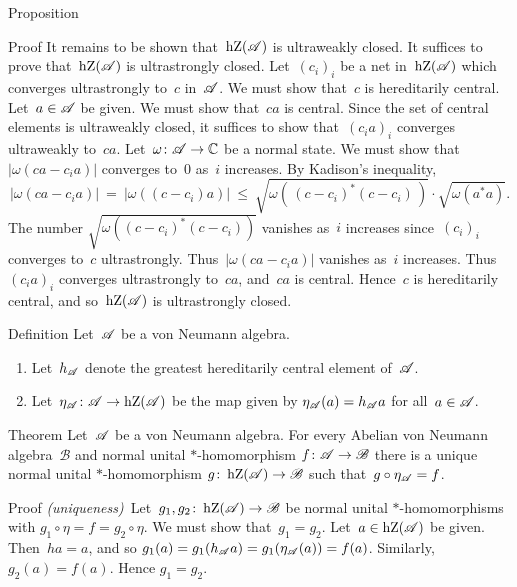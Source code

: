 \documentclass[main]{subfiles}
\begin{document}
\begin{parsec}
\begin{point}{Proposition}
\begin{point}{Proof}
It remains to be shown that~$\operatorname{hZ}(\mathscr{A})$ is ultraweakly closed.
It suffices to prove that~$\operatorname{hZ}(\mathscr{A})$
is ultrastrongly closed.
Let~$(c_i)_i$ be a net in~$\operatorname{hZ}(\mathscr{A})$
which converges ultrastrongly to~$c$ in~$\mathscr{A}$.
We must show that~$c$ is hereditarily central.
Let~$a\in \mathscr{A}$ be given.
We must show that~$ca$ is central.
Since the set of central elements is ultraweakly closed,
it suffices to show that~$(c_ia)_i$ converges ultraweakly to~$ca$.
Let~$\omega\colon\mathscr{A}\to\mathbb{C}$
be a normal state.
We must show that $|\omega(ca-c_ia)|$
converges to~$0$ as~$i$ increases.
By Kadison's inequality,
\begin{equation*}
|\omega(ca -c_ia)| \ =\  |\omega((c-c_i)a)|
\ \leq\  \sqrt{\omega(\,(c-c_i)^*(c-c_i)\,)}\cdot\sqrt{\omega(a^*a)}.
\end{equation*}
The number $\sqrt{\omega((c-c_i)^*(c-c_i))}$ 
vanishes as~$i$ increases
since~$(c_i)_i$ converges to~$c$ ultrastrongly.
Thus~$|\omega(ca-c_ia)|$ vanishes as~$i$ increases.
Thus~$(c_ia)_i$ converges ultrastrongly to~$ca$,
and~$ca$ is central.
Hence~$c$ is hereditarily central,
and so~$\operatorname{hZ}(\mathscr{A})$
is ultrastrongly closed.
\end{point}
\end{point}
\begin{point}{Definition}%
Let~$\mathscr{A}$ be a von Neumann algebra.
\begin{enumerate}
\item
Let~$h_{\mathscr{A}}$ denote the greatest hereditarily central
element of~$\mathscr{A}$.

\item
Let~$\eta_{\mathscr{A}}\colon \mathscr{A}\to \operatorname{hZ}(\mathscr{A})$
be the map given by $\eta_{\mathscr{A}}(a)=h_{\mathscr{A}} a$
for all~$a\in\mathscr{A}$.
\end{enumerate}
\end{point}
\begin{point}{Theorem}%
Let~$\mathscr{A}$
be a von Neumann algebra.
For every Abelian von Neumann algebra~$\mathscr{B}$
and normal unital $*$-homomorphism $f\colon\mathscr{A}\to\mathscr{B}$
there is a unique normal unital $*$-homomorphism 
$g\colon\operatorname{hZ}(\mathscr{A})\to \mathscr{B}$
such that~$g\circ \eta_{\mathscr{A}} = f$.
\begin{point}{Proof}%
\emph{(uniqueness)}\ 
Let~$g_1,g_2\colon \operatorname{hZ}(\mathscr{A})\to\mathscr{B}$
be normal unital $*$-homomorphisms
with $g_1\circ \eta = f = g_2 \circ \eta$.
We must show that~$g_1 = g_2$.
Let~$a\in \operatorname{hZ}(\mathscr{A})$
be given.
Then~$ha=a$, and so $g_1(a) = g_1(h_{\mathscr{A}} a) 
= g_1(\eta_{\mathscr{A}}(a)) = f(a)$.
Similarly, $g_2(a)=f(a)$. Hence $g_1=g_2$.


\end{point}
\end{point}
\end{parsec}
\end{document}
